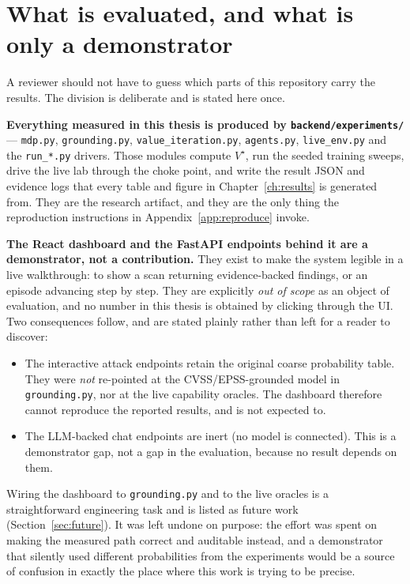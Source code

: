 \documentclass[11pt,a4paper]{report}
\newcommand{\code}[1]{\texttt{\small #1}}
\begin{document}
\section{What is evaluated, and what is only a demonstrator}
\label{sec:scope-of-claims}
A reviewer should not have to guess which parts of this repository carry the
results. The division is deliberate and is stated here once.

\textbf{Everything measured in this thesis is produced by \code{backend/experiments/}}
--- \code{mdp.py}, \code{grounding.py}, \code{value\_iteration.py},
\code{agents.py}, \code{live\_env.py} and the \code{run\_*.py} drivers. Those
modules compute $V^\star$, run the seeded training sweeps, drive the live lab
through the choke point, and write the result JSON and evidence logs that every
table and figure in Chapter~\ref{ch:results} is generated from. They are the
research artifact, and they are the only thing the reproduction instructions in
Appendix~\ref{app:reproduce} invoke.

\textbf{The React dashboard and the FastAPI endpoints behind it are a
demonstrator, not a contribution.} They exist to make the system legible in a
live walkthrough: to show a scan returning evidence-backed findings, or an
episode advancing step by step. They are explicitly \emph{out of scope} as an
object of evaluation, and no number in this thesis is obtained by clicking
through the UI. Two consequences follow, and are stated plainly rather than
left for a reader to discover:
\begin{itemize}
  \item The interactive attack endpoints retain the original coarse
    probability table. They were \emph{not} re-pointed at the
    CVSS/EPSS-grounded model in \code{grounding.py}, nor at the live capability
    oracles. The dashboard therefore cannot reproduce the reported results,
    and is not expected to.
  \item The LLM-backed chat endpoints are inert (no model is connected). This
    is a demonstrator gap, not a gap in the evaluation, because no result
    depends on them.
\end{itemize}
Wiring the dashboard to \code{grounding.py} and to the live oracles is a
straightforward engineering task and is listed as future work
(Section~\ref{sec:future}). It was left undone on purpose: the effort was spent
on making the measured path correct and auditable instead, and a demonstrator
that silently used different probabilities from the experiments would be a
source of confusion in exactly the place where this work is trying to be
precise.
\end{document}
